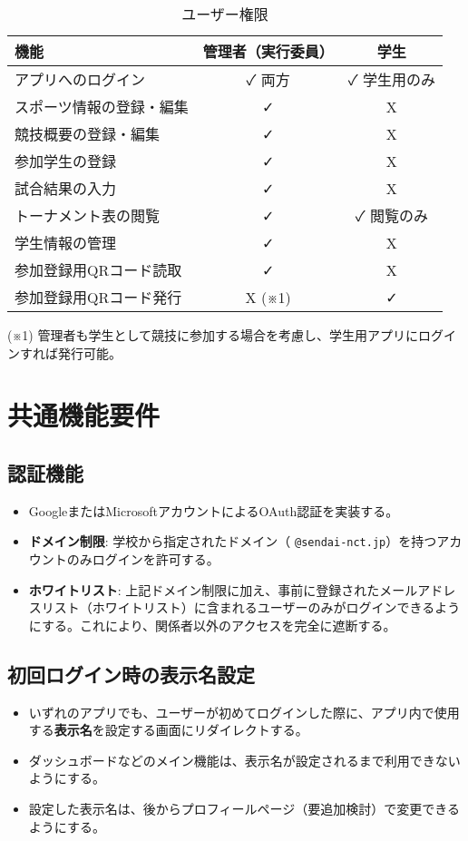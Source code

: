 \documentclass[12pt]{ltjsarticle} %
\begin{document}
\begin{table}[H]
    \centering
    \caption{ユーザー権限}
    \label{tab:permissions}
    \begin{tabular}{lcc}
        \toprule
        \textbf{機能} & \textbf{管理者（実行委員）} & \textbf{学生} \\
        \midrule
        アプリへのログイン & ✓ 両方 & ✓ 学生用のみ \\
        スポーツ情報の登録・編集 & ✓ & X \\
        競技概要の登録・編集 & ✓ & X \\
        参加学生の登録 & ✓ & X \\
        試合結果の入力 & ✓ & X \\
        トーナメント表の閲覧 & ✓ & ✓ 閲覧のみ \\
        学生情報の管理 & ✓ & X \\
        参加登録用QRコード読取 & ✓ & X \\
        参加登録用QRコード発行 & X (※1) & ✓ \\
        \bottomrule
    \end{tabular}
    \begin{flushleft}
        (※1) 管理者も学生として競技に参加する場合を考慮し、学生用アプリにログインすれば発行可能。
    \end{flushleft}
\end{table}


\section{共通機能要件}

\subsection{認証機能}
\begin{itemize}
    \item GoogleまたはMicrosoftアカウントによるOAuth認証を実装する。
    \item \textbf{ドメイン制限}: 学校から指定されたドメイン（ \texttt{@sendai-nct.jp}）を持つアカウントのみログインを許可する。
    \item \textbf{ホワイトリスト}: 上記ドメイン制限に加え、事前に登録されたメールアドレスリスト（ホワイトリスト）に含まれるユーザーのみがログインできるようにする。これにより、関係者以外のアクセスを完全に遮断する。
\end{itemize}

\subsection{初回ログイン時の表示名設定}
\begin{itemize}
    \item いずれのアプリでも、ユーザーが初めてログインした際に、アプリ内で使用する\textbf{表示名}を設定する画面にリダイレクトする。
    \item ダッシュボードなどのメイン機能は、表示名が設定されるまで利用できないようにする。
    \item 設定した表示名は、後からプロフィールページ（要追加検討）で変更できるようにする。
\end{itemize}
\end{document}
